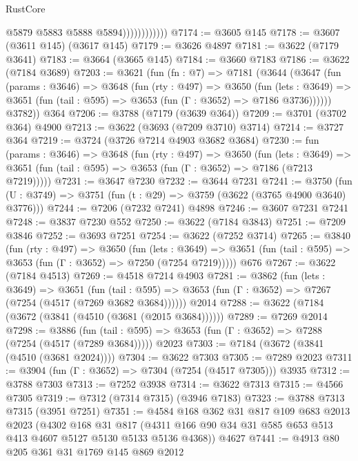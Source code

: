 \begin{lexlean}{RustCore}
\begin{coremodule}
                            @5879
                            @5883
                            @5888
                            @5894))))))))))))
@7174 := @3605 @145
@7178 := @3607 (@3611 @145) (@3617 @145)
@7179 := @3626 @4897
@7181 := @3622 (@7179 @3641)
@7183 := @3664 (@3665 @145)
@7184 := @3660 @7183
@7186 := @3622 (@7184 @3689)
@7203 := @3621
    (fun (fn : @7) =>
    @7181
      (@3644
        (@3647
          (fun (params : @3646) =>
          @3648
            (fun (rty : @497) =>
            @3650
              (fun (lets : @3649) =>
              @3651 (fun (tail : @595) => @3653 (fun (Γ : @3652) => @7186 @3736))))))
        @3782))
    @364
@7206 := @3788 (@7179 (@3639 @364))
@7209 := @3701 (@3702 @364) @4900
@7213 := @3622 (@3693 (@7209 @3710) @3714)
@7214 := @3727 @364
@7219 := @3724 (@3726 @7214 @4903 @3682 @3684)
@7230 := fun (params : @3646) =>
  @3648
    (fun (rty : @497) =>
    @3650
      (fun (lets : @3649) =>
      @3651 (fun (tail : @595) => @3653 (fun (Γ : @3652) => @7186 (@7213 @7219)))))
@7231 := @3647 @7230
@7232 := @3644 @7231
@7241 := @3750 (fun (U : @3749) => @3751 (fun (t : @29) => @3759 (@3622 (@3765 @4900 @3640) @3776)))
@7244 := @7206 (@7232 @7241) @4898
@7246 := @3607 @7231 @7241
@7248 := @3837 @7230 @552
@7250 := @3622 (@7184 @3843)
@7251 := @7209 @3846
@7252 := @3693 @7251
@7254 := @3622 (@7252 @3714)
@7265 := @3840
    (fun (rty : @497) =>
    @3650
      (fun (lets : @3649) =>
      @3651 (fun (tail : @595) => @3653 (fun (Γ : @3652) => @7250 (@7254 @7219)))))
    @676
@7267 := @3622 (@7184 @4513)
@7269 := @4518 @7214 @4903
@7281 := @3862
    (fun (lets : @3649) =>
    @3651
      (fun (tail : @595) => @3653 (fun (Γ : @3652) => @7267 (@7254 (@4517 (@7269 @3682 @3684))))))
    @2014
@7288 := @3622 (@7184 (@3672 (@3841 (@4510 (@3681 (@2015 @3684))))))
@7289 := @7269 @2014
@7298 := @3886
    (fun (tail : @595) => @3653 (fun (Γ : @3652) => @7288 (@7254 (@4517 (@7289 @3684)))))
    @2023
@7303 := @7184 (@3672 (@3841 (@4510 (@3681 @2024))))
@7304 := @3622 @7303
@7305 := @7289 @2023
@7311 := @3904 (fun (Γ : @3652) => @7304 (@7254 (@4517 @7305))) @3935
@7312 := @3788 @7303
@7313 := @7252 @3938
@7314 := @3622 @7313
@7315 := @4566 @7305
@7319 := @7312 (@7314 @7315) (@3946 @7183)
@7323 := @3788 @7313 @7315 (@3951 @7251)
@7351 := @4584
    @168
    @362
    @31
    @817
    @109
    @683
    @2013
    @2023
    (@4302
      @168
      @31
      @817
      (@4311 @166 @90 @34 @31 @585 @653 @513 @413 @4607 @5127 @5130 @5133 @5136 @4368))
    @4627
@7441 := @4913
    @80
    @205
    @361
    @31
    @1769
    @145
    @869
    @2012

\end{coremodule}
\end{lexlean}
